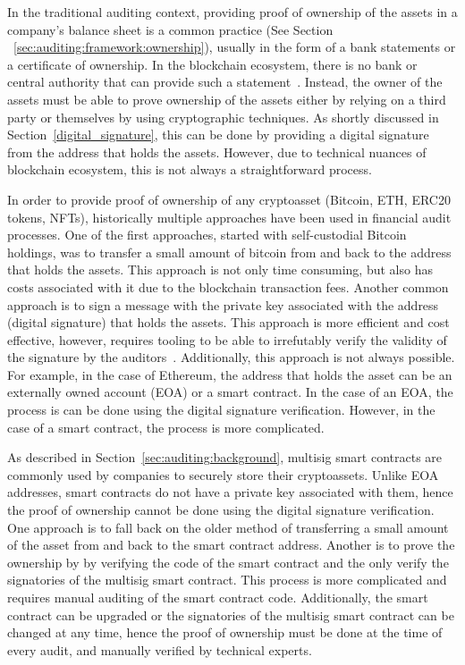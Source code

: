 In the traditional auditing context, providing proof of ownership of the assets in a company's balance sheet is a common practice (See Section ~\ref{sec:auditing:framework:ownership}), usually in the form of a bank statements or a certificate of ownership. In the blockchain ecosystem, there is no bank or central authority that can provide such a statement~\cite{pimentel2021systemizing}. Instead, the owner of the assets must be able to prove ownership of the assets either by relying on a third party or themselves by using cryptographic techniques. As shortly discussed in Section~\ref{digital_signature}, this can be done by providing a digital signature from the address that holds the assets. However, due to technical nuances of blockchain ecosystem, this is not always a straightforward process. 

In order to provide proof of ownership of any cryptoasset (\eg Bitcoin, ETH, ERC20 tokens, NFTs), historically multiple approaches have been used in financial audit processes. One of the first approaches, started with self-custodial Bitcoin holdings, was to transfer a small amount of bitcoin from and back to the address that holds the assets. This approach is not only time consuming, but also has costs associated with it due to the blockchain transaction fees. Another common approach is to sign a message with the private key associated with the address (\eg digital signature) that holds the assets. This approach is more efficient and cost effective, however, requires tooling to be able to irrefutably verify the validity of the signature by the auditors~\cite{gavinwrightcourt}. Additionally, this approach is not always possible. For example, in the case of Ethereum, the address that holds the asset can be an externally owned account (EOA) or a smart contract. In the case of an EOA, the process is can be done using the digital signature verification. However, in the case of a smart contract, the process is more complicated. 

As described in Section~\ref{sec:auditing:background}, multisig smart contracts are commonly used by companies to securely store their cryptoassets. Unlike EOA addresses, smart contracts do not have a private key associated with them, hence the proof of ownership cannot be done using the digital signature verification. One approach is to fall back on the older method of transferring a small amount of the asset from and back to the smart contract address. Another is to prove the ownership by by verifying the code of the smart contract and the only verify the signatories of the multisig smart contract. This process is more complicated and requires manual auditing of the smart contract code. Additionally, the smart contract can be upgraded or the signatories of the multisig smart contract can be changed at any time, hence the proof of ownership must be done at the time of every audit, and manually verified by technical experts.

